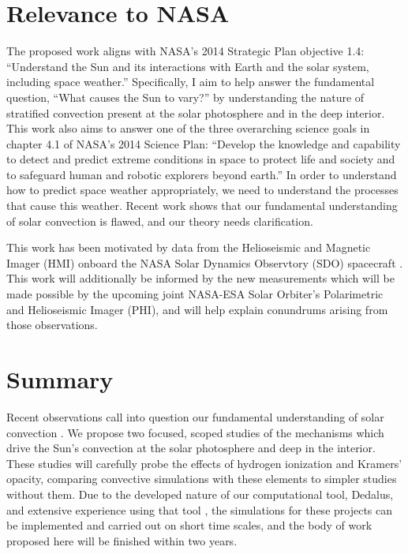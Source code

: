 \documentclass[aasms,12pt]{article}
\begin{document}
\section{Relevance to NASA} 
\vspace{-0.2cm}
The proposed work aligns with NASA's 2014 Strategic Plan objective
1.4:
``Understand the Sun and its interactions with Earth and the solar
system, including space weather.''  Specifically, I aim to help answer
the fundamental question, ``What causes the Sun to vary?'' by understanding
the nature of stratified convection present at the solar photosphere and in the deep interior.
This work also aims to answer one of the three overarching science goals
in chapter 4.1 of NASA's 2014 Science Plan: 
``Develop the
knowledge and capability to detect and predict extreme conditions in space to
protect life and society and to safeguard human and robotic explorers beyond
earth.'' In order to understand how to predict space weather appropriately, we
need to understand the processes that cause this weather.  Recent work
shows that our fundamental understanding of solar convection is flawed, and our theory needs
clarification.

This work has been motivated by data from the Helioseismic and Magnetic Imager (HMI) onboard
the NASA Solar Dynamics Observtory (SDO) spacecraft 
\citep{hanasoge&all2012, greer&all2015, hathaway&all2015}. This work will additionally be informed
by the new measurements which will
be made possible by the upcoming joint NASA-ESA Solar Orbiter's Polarimetric and 
Helioseismic Imager (PHI), and will help explain conundrums arising from those observations.


\vspace{-0.2cm}
\section{Summary}
\vspace{-0.2cm}
Recent observations call into question our fundamental understanding of solar
convection \citep{hanasoge&all2012, greer&all2015, hathaway&all2015}.
We propose two focused, scoped studies of the mechanisms which drive the Sun's convection at
the solar photosphere and deep in the interior.
These studies will carefully probe the effects of hydrogen ionization and Kramers' opacity, comparing
convective simulations with these elements to simpler studies without them.
Due to the developed nature of
our computational tool, Dedalus, and extensive experience using that tool \citep{anders&brown2017},
the simulations for these projects can be implemented and
carried out on short time scales, and the body of work proposed here will be finished within
two years.


\newpage


\end{document}

